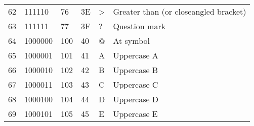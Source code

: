 \begin{center}
\begin{longtable}{llllll}
\rowcolor[HTML]{F3F6F6} 
{\color[HTML]{404040} 62}               & {\color[HTML]{404040} 111110}          & {\color[HTML]{404040} 76}             & {\color[HTML]{404040} 3E}                   & {\color[HTML]{404040} \textgreater{}}     & {\color[HTML]{404040} Greater than (or closeangled bracket)} \\
\rowcolor[HTML]{FCFCFC} 
{\color[HTML]{404040} 63}               & {\color[HTML]{404040} 111111}          & {\color[HTML]{404040} 77}             & {\color[HTML]{404040} 3F}                   & {\color[HTML]{404040} ?}                  & {\color[HTML]{404040} Question mark}                         \\
\rowcolor[HTML]{F3F6F6} 
{\color[HTML]{404040} 64}               & {\color[HTML]{404040} 1000000}         & {\color[HTML]{404040} 100}            & {\color[HTML]{404040} 40}                   & {\color[HTML]{404040} @}                  & {\color[HTML]{404040} At symbol}                             \\
\rowcolor[HTML]{FCFCFC} 
{\color[HTML]{404040} 65}               & {\color[HTML]{404040} 1000001}         & {\color[HTML]{404040} 101}            & {\color[HTML]{404040} 41}                   & {\color[HTML]{404040} A}                  & {\color[HTML]{404040} Uppercase A}                           \\
\rowcolor[HTML]{F3F6F6} 
{\color[HTML]{404040} 66}               & {\color[HTML]{404040} 1000010}         & {\color[HTML]{404040} 102}            & {\color[HTML]{404040} 42}                   & {\color[HTML]{404040} B}                  & {\color[HTML]{404040} Uppercase B}                           \\
\rowcolor[HTML]{FCFCFC} 
{\color[HTML]{404040} 67}               & {\color[HTML]{404040} 1000011}         & {\color[HTML]{404040} 103}            & {\color[HTML]{404040} 43}                   & {\color[HTML]{404040} C}                  & {\color[HTML]{404040} Uppercase C}                           \\
\rowcolor[HTML]{F3F6F6} 
{\color[HTML]{404040} 68}               & {\color[HTML]{404040} 1000100}         & {\color[HTML]{404040} 104}            & {\color[HTML]{404040} 44}                   & {\color[HTML]{404040} D}                  & {\color[HTML]{404040} Uppercase D}                           \\
\rowcolor[HTML]{FCFCFC} 
{\color[HTML]{404040} 69}               & {\color[HTML]{404040} 1000101}         & {\color[HTML]{404040} 105}            & {\color[HTML]{404040} 45}                   & {\color[HTML]{404040} E}                  & {\color[HTML]{404040} Uppercase E}                           \\

\end{longtable}
\end{center}
